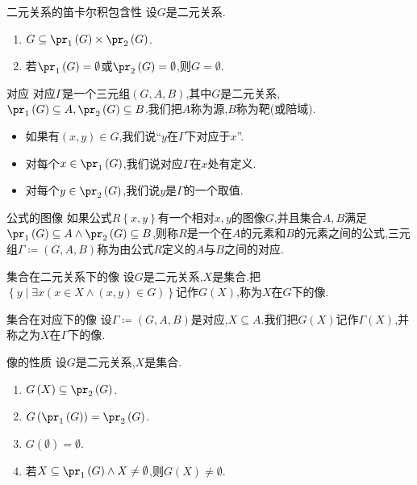 \begin{proposition}{二元关系的笛卡尔积包含性}{}
	设$G$是二元关系.
	\begin{enumerate}
		\item $G\subseteq\pr_{1}\left(G\right)\times\pr_{2}\left(G\right)$.
		\item 若$\pr_{1}\left(G\right)=\emptyset$或$\pr_{2}\left(G\right)=\emptyset$,则$G=\emptyset$.
	\end{enumerate}
\end{proposition}

\begin{definition}{对应}{}
	对应$\Gamma$是一个三元组$\left(G,A,B\right)$,其中$G$是二元关系,$\pr_{1}\left(G\right)\subseteq A,\pr_{2}\left(G\right)\subseteq B$.我们把$A$称为源,$B$称为靶(或陪域).
	\begin{itemize}
		\item 如果有$\left(x,y\right)\in G$,我们说``$y$在$\Gamma$下对应于$x$''.
		\item 对每个$x\in\pr_{1}\left(G\right)$,我们说对应$\Gamma$在$x$处有定义.
		\item 对每个$y\in\pr_{2}\left(G\right)$,我们说$y$是$\Gamma$的一个取值.
	\end{itemize}
\end{definition}

\begin{definition}{公式的图像}{}
	如果公式$R\left\{x,y\right\}$有一个相对$x,y$的图像$G$,并且集合$A,B$满足$\pr_{1}\left(G\right)\subseteq A\wedge\pr_{2}\left(G\right)\subseteq B$,则称$R$是一个在$A$的元素和$B$的元素之间的公式,三元组$\Gamma\coloneq\left(G,A,B\right)$称为由公式$R$定义的$A$与$B$之间的对应.
\end{definition}

\begin{definition}{集合在二元关系下的像}{}
	设$G$是二元关系,$X$是集合.把$\left\{y\middle|\exists x\left(x\in X\wedge\left(x,y\right)\in G\right)\right\}$记作$G\left(X\right)$,称为$X$在$G$下的像.
\end{definition}

\begin{definition}{集合在对应下的像}{}
	设$\Gamma\coloneq\left(G,A,B\right)$是对应,$X\subseteq A$.我们把$G\left(X\right)$记作$\Gamma\left(X\right)$,并称之为$X$在$\Gamma$下的像.
\end{definition}

\begin{proposition}{像的性质}{}
	设$G$是二元关系,$X$是集合.
	\begin{enumerate}
		\item $G\left(X\right)\subseteq\pr_{2}\left(G\right)$.
		\item $G\left(\pr_{1}\left(G\right)\right)=\pr_{2}\left(G\right)$.
		\item $G\left(\emptyset\right)=\emptyset$.
		\item 若$X\subseteq\pr_{1}\left(G\right)\wedge X\neq\emptyset$,则$G\left(X\right)\neq\emptyset$.
	\end{enumerate}
\end{proposition}

